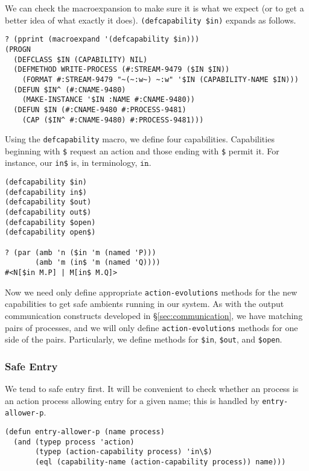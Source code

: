 \documentclass[12pt]{article}
\begin{document}
We can check the macroexpansion to make sure it is what we expect (or to get a better idea of what exactly it does).
\texttt{(defcapability \$in)} expands as follows.

\begin{verbatim}
? (pprint (macroexpand '(defcapability $in)))
(PROGN
  (DEFCLASS $IN (CAPABILITY) NIL)
  (DEFMETHOD WRITE-PROCESS (#:STREAM-9479 ($IN $IN))
    (FORMAT #:STREAM-9479 "~(~:w~) ~:w" '$IN (CAPABILITY-NAME $IN)))
  (DEFUN $IN^ (#:CNAME-9480)
    (MAKE-INSTANCE '$IN :NAME #:CNAME-9480))
  (DEFUN $IN (#:CNAME-9480 #:PROCESS-9481)
    (CAP ($IN^ #:CNAME-9480) #:PROCESS-9481)))
\end{verbatim}

Using the \texttt{defcapability} macro, we define four capabilities.
Capabilities beginning with \texttt{\$} request an action and those ending with \texttt{\$} permit it.
For instance, our \texttt{in\$} is, in  terminology, $\overline{\mathtt{in}}$.

\begin{verbatim}
(defcapability $in)
(defcapability in$)
(defcapability $out)
(defcapability out$)
(defcapability $open)
(defcapability open$)

? (par (amb 'n ($in 'm (named 'P)))
       (amb 'm (in$ 'm (named 'Q))))
#<N[$in M.P] | M[in$ M.Q]>
\end{verbatim}

Now we need only define appropriate \texttt{action-evolutions} methods for the new capabilities to get safe ambients running in our system.
As with the output communication constructs developed in \S\ref{sec:communication}, we have matching pairs of processes, and we will only define \texttt{action-evolutions} methods for one side of the pairs.
Particularly, we define methods for \texttt{\$in}, \texttt{\$out}, and \texttt{\$open}.

\subsubsection{Safe Entry}
\label{sec:safe-entry}

We tend to safe entry first.
It will be convenient to check whether an process is an action process allowing entry for a given name; 
this is handled by \texttt{entry-allower-p}.

\begin{verbatim}
(defun entry-allower-p (name process)
  (and (typep process 'action)
       (typep (action-capability process) 'in\$)
       (eql (capability-name (action-capability process)) name)))
\end{verbatim}
\end{document}
